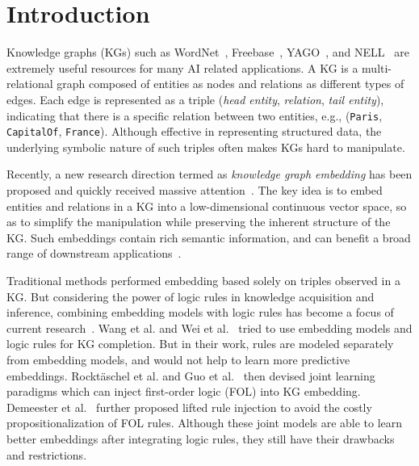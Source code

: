 \documentclass[letterpaper]{article} \usepackage{aaai18}  \usepackage{times}  \usepackage{helvet}  \usepackage{courier}  \usepackage{url}  \usepackage{graphicx}  \usepackage{amsmath}
\begin{document}
\section{Introduction}
Knowledge graphs (KGs) such as WordNet~\cite{miller1995:WordNet}, Freebase~\cite{bollacker2008:FreeBase}, YAGO~\cite{suchanek2007:YAGO}, and NELL~\cite{carlson2010:NELL} are extremely useful resources for many AI related applications. A KG is a multi-relational graph composed of entities as nodes and relations as different types of edges. Each edge is represented as a triple (\textit{head entity}, \textit{relation}, \textit{tail entity}), indicating that there is a specific relation between two entities, e.g., (\texttt{\small Paris}, \texttt{\small CapitalOf}, \texttt{\small France}). Although effective in representing structured data, the underlying symbolic nature of such triples often makes KGs hard to manipulate.

Recently, a new research direction termed as \textit{knowledge graph embedding} has been proposed and quickly received massive attention~\cite{nickel2011:RESCAL,bordes2013:TransE,wang2014:TransH,lin2015:TransR,yang2015:DistMult,nickel2016:HolE,trouillon2016:ComplEx}. The key idea is to embed entities and relations in a KG into a low-dimensional continuous vector space, so as to simplify the manipulation while preserving the inherent structure of the KG. Such embeddings contain rich semantic information, and can benefit a broad range of downstream applications~\cite{weston2013:RE,bordes2014:SME,zhang2016:RecSys,xiong2017:ESR}.

Traditional methods performed embedding based solely on triples observed in a KG. But considering the power of logic rules in knowledge acquisition and inference, combining embedding models with logic rules has become a focus of current research~\cite{rocktaschel2014:EmbedLogic,vendrov2015:OrderEmbeddings,wang2016:LogicEmbeddings,hu2016:RuleCNN}. Wang et al.  and Wei et al.~ tried to use embedding models and logic rules for KG completion. But in their work, rules are modeled separately from embedding models, and would not help to learn more predictive embeddings. Rockt\"{a}schel et al.  and Guo et al.~ then devised joint learning paradigms which can inject first-order logic (FOL) into KG embedding. Demeester et al.~ further proposed lifted rule injection to avoid the costly propositionalization of FOL rules. Although these joint models are able to learn better embeddings after integrating logic rules, they still have their drawbacks and restrictions.
\end{document}
